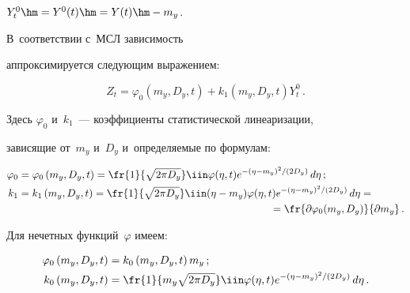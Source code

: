 $Y_t^0 \hm= Y^0(t) \hm= Y(t) \hm- m_y$. 

В~соответствии с~МСЛ зависимость 

аппроксимируется следующим выражением:

    \begin{equation}

    Z_t =  \varphi_0 \left(m_y, D_y,t\right) + k_1\left(m_y, D_y,t\right) Y_t^0\,.

    \label{e2.9-sin}

    \end{equation}

Здесь $\varphi_0$ и~$k_1$~--- коэффициенты статистической линеаризации, 

зависящие от~$m_y$ и~$D_y$  и~определяемые по формулам:

    \begin{align*}

    \varphi_0 &= \varphi_0 \left(m_y, D_y,t\right) = \fr{1}{\sqrt{2\pi D_y}} 

    \iin \varphi(\eta,t) e^{-(\eta-m_y)^2/(2D_y)}\, d\eta\,;


\\

    k_1 &= k_1\left(m_y, D_y,t\right) = \fr{1}{\sqrt{2\pi D_y}} 

    \iin (\eta-m_y) \varphi(\eta,t) e^{-(\eta-m_y)^2/(2D_y)}\, d\eta = {}\\

    &\hspace*{85mm}{}=

    \fr{\partial \varphi_0 (m_y, D_y)}{\partial m_y}\,.


\end{align*}

Для нечетных функций~$\varphi$ имеем:

    \begin{align}

    \varphi_0 \left(m_y, D_y,t\right)& = k_0 \left(m_y, D_y,t\right) m_y\,;

\notag%

    \\

     k_0\left(m_y, D_y,t\right) &= \fr{1}{m_y \sqrt{2\pi D_y}} 

    \iin \varphi (\eta,t) e^{-(\eta-m_y)^2/(2D_y)}\, d\eta\,.

    \label{e2.13-sin}

    \end{align}



